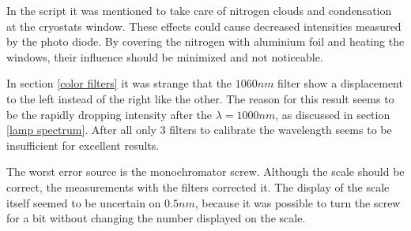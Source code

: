 \documentclass[]{article}
\begin{document}
In the script it was mentioned to take care of nitrogen clouds and condensation at the cryostats window. These effects could cause decreased intensities measured by the photo diode. By covering the nitrogen with aluminium foil and heating the windows, their influence should be minimized and not noticeable.

In section \ref{color filters} it was strange that the $1060nm$ filter show a displacement to the left instead of the right like the other. The reason for this result seems to be the rapidly dropping intensity after the $\lambda =1000nm$, as discussed in section \ref{lamp spectrum}. After all only 3 filters to calibrate the wavelength seems to be insufficient for excellent results.

The worst error source is the monochromator screw. Although the scale should be correct, the measurements with the filters corrected it. The display of the scale itself seemed to be uncertain on $0.5nm$, because it was possible to turn the screw for a bit without changing the number displayed on the scale. 


\newpage
\end{document}
